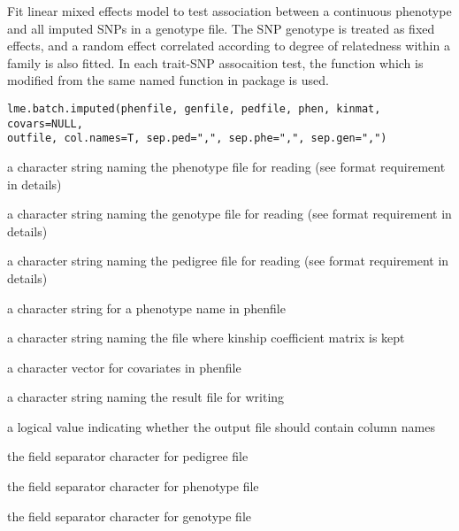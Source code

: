 \begin{Description}\relax
Fit linear mixed effects model to test association between a continuous phenotype 
and all imputed SNPs in a genotype file. The SNP genotype is treated
as fixed effects, and a random effect correlated according to degree of relatedness within a 
family is also fitted. In each trait-SNP assocaition test, the  function which is modified from
the same named function in package  is used.
\end{Description}
\begin{Usage}
\begin{verbatim}
lme.batch.imputed(phenfile, genfile, pedfile, phen, kinmat, covars=NULL, 
outfile, col.names=T, sep.ped=",", sep.phe=",", sep.gen=",")
\end{verbatim}
\end{Usage}
\begin{Arguments}
\begin{ldescription}
\item[\code{phenfile}] a character string naming the phenotype file for reading (see format requirement in details) 
\item[\code{genfile}] a character string naming the genotype file for reading (see format requirement in details) 
\item[\code{pedfile}] a character string naming the pedigree file for reading (see format requirement in details)
\item[\code{phen}] a character string for a phenotype name in phenfile  
\item[\code{kinmat}] a character string naming the file where kinship coefficient matrix is kept 
\item[\code{covars}] a character vector for covariates in phenfile 
\item[\code{outfile}] a character string naming the result file for writing 
\item[\code{col.names}] a logical value indicating whether the output file should contain column names 
\item[\code{sep.ped}] the field separator character for pedigree file 
\item[\code{sep.phe}] the field separator character for phenotype file 
\item[\code{sep.gen}] the field separator character for genotype file 
\end{ldescription}
\end{Arguments}
